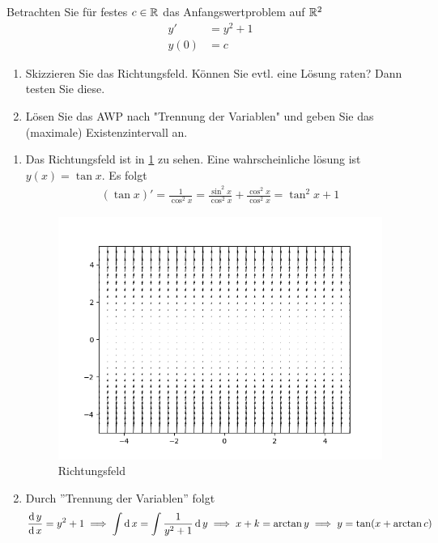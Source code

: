 \documentclass[ngerman]{report}
\begin{document}
    \begin{question}
        Betrachten Sie für festes $c \in\R$ das Anfangswertproblem auf $\R^2$ 
        \begin{align*}
            y' &= y^2+1\\
            y(0) &= c                        
        \end{align*}
\begin{enumerate}
    \item Skizzieren Sie das Richtungsfeld. Können Sie evtl. eine Lösung raten? Dann testen Sie diese. 
    \item Lösen Sie das AWP nach "Trennung der Variablen" und geben Sie das (maximale) Existenzintervall an.
\end{enumerate} 
\end{question}
\begin{answer}\hspace{\textwidth}
\begin{enumerate}
    \item Das Richtungsfeld ist in \cref{fig:richtungsfeld.png} zu sehen. Eine wahrscheinliche lösung ist $y(x) = \tan x$. Es folgt
    \begin{align*}
        (\tan x)' = \frac{1}{\cos^2 x} = \frac{\sin^2 x}{\cos^2 x} + \frac{\cos^2 x}{\cos^2 x}= \tan^2 x+1
    \end{align*}
    \begin{figure}
        \centering
        \includegraphics[width=\textwidth]{../figures/01-richtungsfeld.png}
        \caption{Richtungsfeld}
        \label{fig:richtungsfeld.png}
    \end{figure}
    \item Durch ''Trennung der Variablen'' folgt
    \begin{align*}
        \der[y]{x} = y^2+1 \implies \int \dif x = \int\frac{1}{y^2+1}\dif y \implies x+k = \arctan y \implies y = \tan (x+\arctan c)
    \end{align*}
\end{enumerate}
\end{answer}
    
\end{document}
